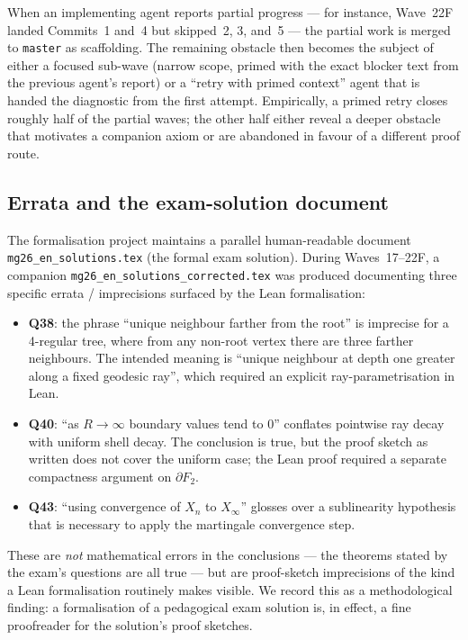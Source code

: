 \documentclass[11pt,a4paper]{article}
\newcommand{\cmd}[1]{\texttt{\small #1}}
\newcommand{\BFG}{\partial F_2}
\theoremstyle{plain}
\theoremstyle{definition}
\begin{document}
When an implementing agent reports partial progress --- for instance,
Wave~22F landed Commits~1 and~4 but skipped~2, 3, and~5 --- the
partial work is merged to \cmd{master} as scaffolding. The remaining
obstacle then becomes the subject of either a focused sub-wave (narrow
scope, primed with the exact blocker text from the previous agent's
report) or a ``retry with primed context'' agent that is handed the
diagnostic from the first attempt. Empirically, a primed retry closes
roughly half of the partial waves; the other half either reveal a
deeper obstacle that motivates a companion axiom or are abandoned in
favour of a different proof route.

\subsection{Errata and the exam-solution document}

The formalisation project maintains a parallel human-readable document
\cmd{mg26\_en\_solutions.tex} (the formal exam solution). During
Waves~17--22F, a companion \cmd{mg26\_en\_solutions\_corrected.tex}
was produced documenting three specific errata / imprecisions surfaced
by the Lean formalisation:

\begin{itemize}[leftmargin=1.3em]
  \item \textbf{Q38}: the phrase ``unique neighbour farther from the
        root'' is imprecise for a 4-regular tree, where from any non-root
        vertex there are three farther neighbours. The intended meaning
        is ``unique neighbour at depth one greater along a fixed geodesic
        ray'', which required an explicit ray-parametrisation in Lean.
  \item \textbf{Q40}: ``as $R\to\infty$ boundary values tend to $0$''
        conflates pointwise ray decay with uniform shell decay. The
        conclusion is true, but the proof sketch as written does not
        cover the uniform case; the Lean proof required a separate
        compactness argument on $\BFG$.
  \item \textbf{Q43}: ``using convergence of $X_n$ to $X_\infty$''
        glosses over a sublinearity hypothesis that is necessary to
        apply the martingale convergence step.
\end{itemize}

These are \emph{not} mathematical errors in the conclusions --- the
theorems stated by the exam's questions are all true --- but are
proof-sketch imprecisions of the kind a Lean formalisation routinely
makes visible. We record this as a methodological finding: a
formalisation of a pedagogical exam solution is, in effect, a fine
proofreader for the solution's proof sketches.
\end{document}

